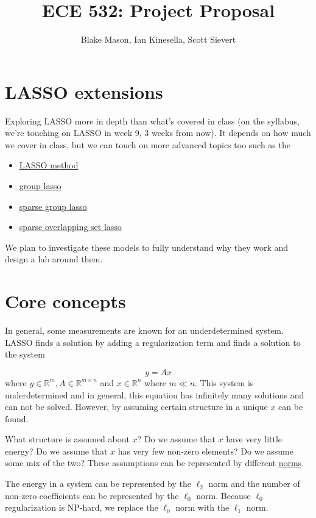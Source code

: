 \documentclass{article}
\title{ECE 532: Project Proposal}
\author{Blake Mason, Ian Kinesella, Scott Sievert}
\newcommand{\SSlasso}{https://en.wikipedia.org/wiki/Least_squares\#Lasso_method}
\newcommand{\groupLasso}{http://www.jstor.org/stable/20203811?seq=1\#page_scan_tab_contents}
\newcommand{\sparseGroupLasso}{http://arxiv.org/abs/1001.0736}
\newcommand{\SOSlasso}{http://papers.nips.cc/paper/4891-sparse-overlapping-sets-lasso-for-multitask-learning-and-its-application-to}
\newcommand{\norm}{https://en.wikipedia.org/wiki/Norm_(mathematics)}
\newcommand{\real}{\mathbb{R}}
\begin{document}
\maketitle


\section{LASSO extensions}
Exploring LASSO more in depth than what's covered in class (on the syllabus, we're touching on LASSO in week 9, 3 weeks from now). It depends on how much we cover in class, but we can touch on more advanced topics too such as the

\begin{itemize}
    \item \href{\SSlasso}{LASSO method} \cite{tibshirani1996regression}
   \item \href{\groupLasso}{group lasso} \cite{meier2008group}
   \item \href{\sparseGroupLasso}{sparse group lasso} \cite{friedman2010note}
   \item \href{\SOSlasso}{sparse overlapping set lasso} \cite{rao2013sparse}
\end{itemize}

We plan to investigate these models to fully understand why they work and design a lab around them.

\section{Core concepts}
In general, some measurements are known for an underdetermined system. LASSO finds a solution by adding a regularization term and finds a solution to the system

$$y = Ax$$ where $y \in \real^m, A\in \real^{m\times n}$ and $x \in \real^n$ where $m \ll n$. This system is underdetermined and in general, this equation has infinitely many solutions and can not be solved. However, by assuming certain structure in a unique $x$ can be found.

What structure is assumed about $x$? Do we assume that $x$ have very little energy? Do we assume that $x$ has very few non-zero elements? Do we assume some mix of the two? These assumptions can be represented by different \href{\norm}{norms}.

The energy in a system can be represented by the $\ell_2$ norm and the number of non-zero coefficients can be represented by the $\ell_0$ norm. Because $\ell_0$ regularization is NP-hard, we replace the $\ell_0$ norm with the $\ell_1$ norm.
\end{document}
